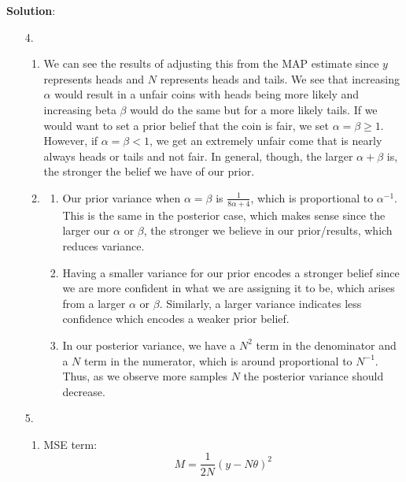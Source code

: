 \documentclass[submit]{../harvardml}
\newenvironment{answer}{
    \vspace{2mm}
    \color{blue}\noindent\textbf{Solution}:
}{}
\begin{document}
\begin{answer}
\begin{enumerate}
\begin{enumerate}
      \end{enumerate}

    \item[4.]

      \begin{enumerate}
        \item
         We can see the results of adjusting this from the MAP estimate since $y$ represents heads and $N$ represents heads and tails. We see that increasing $\alpha$ would result in a unfair coins with heads being more likely and increasing beta $\beta$ would do the same but for a more likely tails. If we would want to set a prior belief that the coin is fair, we set $\alpha = \beta \ge 1$. However, if $\alpha = \beta < 1$, we get an extremely unfair come that is nearly always heads or tails and not fair. In general, though, the larger $\alpha + \beta$ is, the stronger the belief we have of our prior.

        \item
              \begin{enumerate}
                \item
                Our prior variance when $\alpha = \beta$ is $\frac{1}{8\alpha + 4}$, which is proportional to $\alpha^{-1}$. This is the same in the posterior case, which makes sense since the larger our $\alpha$ or $\beta$, the stronger we believe in our prior/results, which reduces variance.

                \item Having a smaller variance for our prior encodes a stronger belief since we are more confident in what we are assigning it to be, which arises from a larger $\alpha$ or $\beta$. Similarly, a larger variance indicates less confidence which encodes a weaker prior belief.

                \item In our posterior variance, we have a $N^2$ term in the denominator and a $N$ term in the numerator, which is around proportional to $N^{-1}$. Thus, as we observe more samples $N$ the posterior variance should decrease.
              \end{enumerate}

      \end{enumerate}

    \item[5.]

      \begin{enumerate}
        \item
              MSE term:
              \[
                M = \frac{1}{2N}(y - N\theta)^2
              \]


\end{enumerate}
\end{enumerate}
\end{answer}
\end{document}
